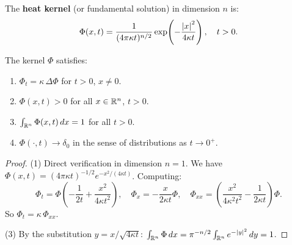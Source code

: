\begin{definition}
The \textbf{heat kernel} (or fundamental solution) in dimension $n$ is:
\begin{equation}\label{eq:heat_kernel}
    \Phi(x,t) = \frac{1}{(4\pi\kappa t)^{n/2}}
    \exp\!\left(-\frac{\left| x \right|^2}{4\kappa t}\right), \quad t > 0.
\end{equation}
\end{definition}

\begin{theorem}
The kernel $\Phi$ satisfies:
\begin{enumerate}
    \item $\Phi_t = \kappa\, \Delta \Phi$ for $t > 0$, $x \neq 0$.
    \item $\Phi(x,t) > 0$ for all $x \in \mathbb{R}^n$, $t > 0$.
    \item $\int_{\mathbb{R}^n} \Phi(x,t)\, dx = 1$ for all $t > 0$.
    \item $\Phi(\cdot, t) \to \delta_0$ in the sense of distributions as $t \to 0^+$.
\end{enumerate}
\end{theorem}

\begin{proof}
(1) Direct verification in dimension $n = 1$. We have
$\Phi(x,t) = (4\pi\kappa t)^{-1/2} e^{-x^2/(4\kappa t)}$. Computing:
\[
    \Phi_t = \Phi\left(-\frac{1}{2t} + \frac{x^2}{4\kappa t^2}\right),
    \quad
    \Phi_x = -\frac{x}{2\kappa t}\Phi, \quad
    \Phi_{xx} = \left(\frac{x^2}{4\kappa^2 t^2} - \frac{1}{2\kappa t}\right)\Phi.
\]
So $\Phi_t = \kappa\, \Phi_{xx}$.

(3) By the substitution $y = x/\sqrt{4\kappa t}$:
$\int_{\mathbb{R}^n} \Phi\, dx = \pi^{-n/2}\int_{\mathbb{R}^n} e^{-\left| y \right|^2}\, dy = 1$.
\end{proof}

\begin{center}
\end{center}

